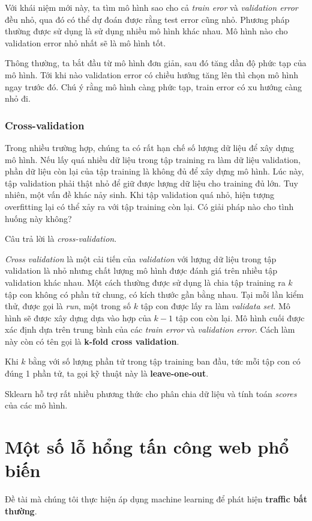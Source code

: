 \documentclass[../main-report.tex]{subfiles}
\begin{document}
Với khái niệm mới này, ta tìm mô hình sao cho cả \emph{train eror} và \emph{validation error} đều nhỏ, qua đó có thể dự đoán được rằng test error cũng nhỏ. Phương pháp thường được sử dụng là sử dụng nhiều mô hình khác nhau. Mô hình nào cho validation error nhỏ nhất sẽ là mô hình tốt.

Thông thường, ta bắt đầu từ mô hình đơn giản, sau đó tăng dần độ phức tạp của mô hình. Tới khi nào validation error có chiều hướng tăng lên thì chọn mô hình ngay trước đó. Chú ý rằng mô hình càng phức tạp, train error có xu hướng càng nhỏ đi.

\subsubsection*{Cross-validation}
Trong nhiều trường hợp, chúng ta có rất hạn chế số lượng dữ liệu để xây dựng mô hình. Nếu lấy quá nhiều dữ liệu trong tập training ra làm dữ liệu validation, phần dữ liệu còn lại của tập training là không đủ để xây dựng mô hình. Lúc này, tập validation phải thật nhỏ để giữ được lượng dữ liệu cho training đủ lớn. Tuy nhiên, một vấn đề khác nảy sinh. Khi tập validation quá nhỏ, hiện tượng overfitting lại có thể xảy ra với tập training còn lại. Có giải pháp nào cho tình huống này không?

Câu trả lời là \emph{cross-validation}.

\emph{Cross validation} là một cải tiến của \emph{validation} với lượng dữ liệu trong tập validation là nhỏ nhưng chất lượng mô hình được đánh giá trên nhiều tập validation khác nhau. Một cách thường được sử dụng là chia tập training ra \(k\) tập con không có phần tử chung, có kích thước gần bằng nhau. Tại mỗi lần kiểm thử, được gọi là \emph{run}, một trong số \(k\) tập con được lấy ra làm \emph{validata set}. Mô hình sẽ được xây dựng dựa vào hợp của \(k-1\) tập con còn lại. Mô hình cuối được xác định dựa trên trung bình của các \emph{train error} và \emph{validation error}. Cách làm này còn có tên gọi là \textbf{k-fold cross validation}.

Khi \(k\) bằng với số lượng phần tử trong tập training ban đầu, tức mỗi tập con có đúng 1 phần tử, ta gọi kỹ thuật này là \textbf{leave-one-out}.

Sklearn hỗ trợ rất nhiều phương thức cho phân chia dữ liệu và tính toán \emph{scores} của các mô hình.
\section{Một số lỗ hổng tấn công web phổ biến}
Đề tài mà chúng tôi thực hiện áp dụng machine learning để phát hiện \textbf{traffic bất thường}.
\end{document}
